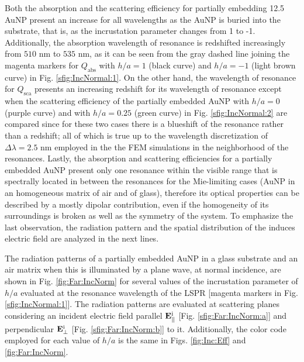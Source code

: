 Both the absorption and the scattering efficiency for partially embedding 12.5 AuNP present an increase  for all wavelengths as the AuNP is buried into the substrate, that is, as the incrustation parameter changes from 1 to -1. Additionally, the  absorption wavelength of resonance is redshifted  increasingly from $510$ nm to $535$ nm, as it can be seen from the gray dashed line joining the magenta markers for  $Q_\text{abs}$  with $h/a = 1$ (black curve) and $h/a = -1$ (light brown curve) in Fig. \ref{sfig:IncNormal:1}. On the other hand, the wavelength of resonance for $Q_\text{sca}$ presents an increasing redshift for its wavelength of resonance except when the scattering efficiency of the partially embedded AuNP with $h/a = 0$ (purple curve) and with $h/a = 0.25$ (green curve) in Fig. \ref{sfig:IncNormal:2} are compared since for these two cases there is a blueshift of the resonance rather than a redshift; all of which is true up to the wavelength discretization of $\Delta\lambda = 2.5$ nm employed in the the FEM simulations in the neighborhood of the resonances. Lastly, the absorption and scattering efficiencies for a partially embedded AuNP present only one resonance within the visible range that is spectrally located in between the resonances for the Mie-limiting cases (AuNP in an homogeneous matrix of air and of glass), therefore its optical properties can be described by a mostly dipolar contribution, even if the homogeneity of its surroundings is broken as well as the symmetry of the system. To emphasize the last observation, the radiation pattern and the spatial distribution of the induces electric field are analyzed in the next lines.

The radiation patterns of a partially embedded AuNP in a glass substrate and an air matrix when this is illuminated by a plane wave,  at normal incidence, are shown in Fig. \ref{fig:Far:IncNorm} for several values of the incrustation parameter of $h/a$ evaluated at the resonance wavelength of the LSPR [magenta markers in Fig. \ref{sfig:IncNormal:1}]. The  radiation patterns are evaluated at scattering planes considering an incident electric field parallel  $\vb{E}^\text{i}_\parallel$ [Fig. \ref{sfig:Far:IncNorm:a}] and  perpendicular  $\vb{E}^\text{i}_\perp$ [Fig. \ref{sfig:Far:IncNorm:b}] to it. Additionally, the color code employed for each value of $h/a$ is the same in Figs. \ref{fig:Inc:Eff} and \ref{fig:Far:IncNorm}.

